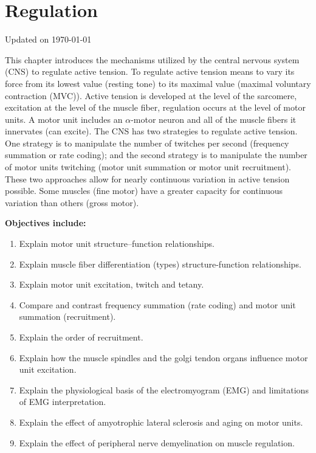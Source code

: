 \chapter{Regulation}\label{chp:regulation}
Updated on \today
\minitoc

This chapter introduces the mechanisms utilized by the central nervous system (CNS) to regulate active tension. To regulate active tension means to vary its force from its lowest value (resting tone) to its maximal value (maximal voluntary contraction (MVC)). Active tension is developed at the level of the sarcomere, excitation at the level of the muscle fiber, regulation occurs at the level of motor units. A motor unit includes an $\alpha$-motor neuron and all of the muscle fibers it innervates (can excite). The CNS has two strategies to regulate active tension. One strategy is to manipulate the number of twitches per second (frequency summation or rate coding); and the second strategy is to manipulate the number of motor units twitching (motor unit summation or motor unit recruitment). These two approaches allow for nearly continuous variation in active tension possible. Some muscles (fine motor) have a greater capacity for continuous variation than others (gross motor).

\vspace{5mm}

\begin{svgraybox}
\textbf{Objectives include:}
\begin{enumerate}
    \item Explain motor unit structure–function relationships.
    \item Explain muscle fiber differentiation (types) structure-function relationships.
    \item Explain motor unit excitation, twitch and tetany.
    \item Compare and contrast frequency summation (rate coding) and motor unit summation (recruitment).
    \item Explain the order of recruitment.
    \item Explain how the muscle spindles and the golgi tendon organs influence motor unit excitation.
    \item Explain the physiological basis of the electromyogram (EMG) and limitations of EMG interpretation.
    \item Explain the effect of amyotrophic lateral sclerosis and aging on motor units.
    \item Explain the effect of peripheral nerve demyelination on muscle regulation.
\end{enumerate}\
\end{svgraybox}
